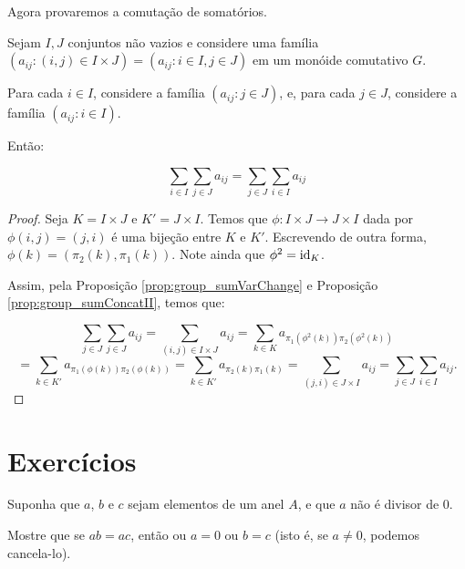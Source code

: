 Agora provaremos a comutação de somatórios.

\begin{prop}\label{prop:group_sumCommut}
    Sejam $I, J$ conjuntos não vazios e considere uma família $(a_{ij}:(i, j)\in I\times J)=(a_{ij}:i \in I, j \in J)$ em um monóide comutativo $G$.

    Para cada $i \in I$, considere a família $(a_{ij}: j \in J)$, e, para cada $j \in J$, considere a família $(a_{ij}: i \in I)$.

    Então:

    \[\sum_{i\in I}\sum_{j \in J}a_{ij}=\sum_{j \in J}\sum_{i \in I}a_{ij}\]
\end{prop}
\begin{proof}
    Seja $K=I\times J$ e $K'=J\times I$.
    Temos que $\phi:I\times J\rightarrow J\times I$ dada por $\phi(i, j)=(j, i)$ é uma bijeção entre $K$ e $K'$. Escrevendo de outra forma, $\phi(k)=(\pi_2(k), \pi_1(k))$. Note ainda que $\phi^2=\operatorname{id}_K$.

    Assim, pela Proposição \ref{prop:group_sumVarChange} e Proposição \ref{prop:group_sumConcatII}, temos que:

    \[\sum_{j\in J}\sum_{j \in J}a_{ij}=\sum_{(i,j)\in I\times J}a_{ij}=\sum_{k\in K}a_{\pi_1(\phi^2(k))\pi_2(\phi^2(k))}\]
    \[=\sum_{k \in K'}a_{\pi_1(\phi(k))\pi_2(\phi(k))}=\sum_{k \in K'}a_{\pi_2(k)\pi_1(k)}=\sum_{(j, i)\in J\times I}a_{ij}=\sum_{j \in J}\sum_{i \in I}a_{ij}.\]

\end{proof}

\section{Exercícios}
\begin{exer}
    Suponha que $a$, $b$ e $c$ sejam elementos de um anel $A$, e que $a$ não é divisor de $0$.
    
    Mostre que se $ab = ac$, então ou $a = 0$ ou $b = c$ (isto é, se $a\neq 0$, podemos cancela-lo).
\end{exer}

